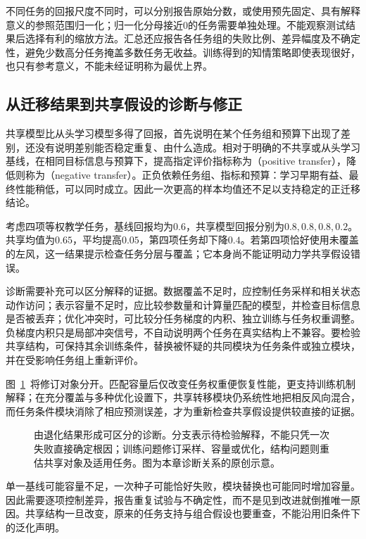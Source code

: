 不同任务的回报尺度不同时，可以分别报告原始分数，或使用预先固定、具有解释意义的参照范围归一化；归一化分母接近0的任务需要单独处理。不能观察测试结果后选择有利的缩放方法。汇总还应报告各任务组的失败比例、差异幅度及不确定性，避免少数高分任务掩盖多数任务无收益。训练得到的知情策略即使表现很好，也只有参考意义，不能未经证明称为最优上界。

\subsection{从迁移结果到共享假设的诊断与修正}
\label{sec:rl-transfer-diagnosis}

共享模型比从头学习模型多得了回报，首先说明在某个任务组和预算下出现了差别，还没有说明差别能否稳定重复、由什么造成。相对于明确的不共享或从头学习基线，在相同目标信息与预算下，提高指定评价指标称为（positive transfer），降低则称为（negative transfer）。正负依赖任务组、指标和预算：学习早期有益、最终性能稍低，可以同时成立。因此一次更高的样本均值还不足以支持稳定的正迁移结论。

考虑四项等权教学任务，基线回报均为$0.6$，共享模型回报分别为$0.8,0.8,0.8,0.2$。共享均值为$0.65$，平均提高$0.05$，第四项任务却下降$0.4$。若第四项恰好使用未覆盖的左风，这一结果提示检查任务分层与覆盖；它本身尚不能证明动力学共享假设错误。

诊断需要补充可以区分解释的证据。数据覆盖不足时，应控制任务采样和相关状态动作访问；表示容量不足时，应比较参数量和计算量匹配的模型，并检查目标信息是否被丢弃；优化冲突时，可比较分任务梯度的内积、独立训练与任务权重调整。负梯度内积只是局部冲突信号，不自动说明两个任务在真实结构上不兼容。要检验共享结构，可保持其余训练条件，替换被怀疑的共同模块为任务条件或独立模块，并在受影响任务组上重新评价。

图~\ref{fig:rl-transfer-diagnosis}~将修订对象分开。匹配容量后仅改变任务权重便恢复性能，更支持训练机制解释；在充分覆盖与多种优化设置下，共享转移模块仍系统性地把相反风向混合，而任务条件模块消除了相应预测误差，才为重新检查共享假设提供较直接的证据。

\begin{figure}[htbp]
 \centering
 
 \caption{由退化结果形成可区分的诊断。分支表示待检验解释，不能只凭一次失败直接确定根因；训练问题修订采样、容量或优化，结构问题则重估共享对象及适用任务。图为本章诊断关系的原创示意。}
 \label{fig:rl-transfer-diagnosis}
\end{figure}

单一基线可能容量不足，一次种子可能恰好失败，模块替换也可能同时增加容量。因此需要逐项控制差异，报告重复试验与不确定性，而不是见到改进就倒推唯一原因。共享结构一旦改变，原来的任务支持与组合假设也要重查，不能沿用旧条件下的泛化声明。

